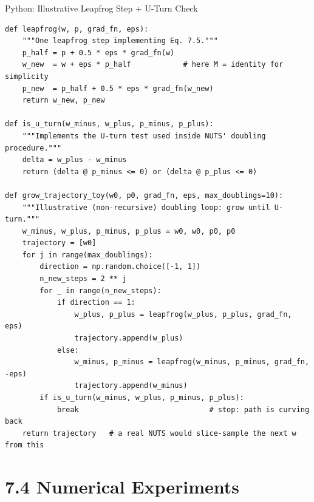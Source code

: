 \documentclass[aspectratio=169,10pt]{beamer}
\begin{document}
\begin{frame}[fragile]{Python: Illustrative Leapfrog Step + U-Turn Check}
\begin{lstlisting}[caption={Toy leapfrog integrator and a NUTS-style U-turn test (illustrative, simplified -- omits the full recursive doubling tree and slice sampling for brevity)}]
def leapfrog(w, p, grad_fn, eps):
    """One leapfrog step implementing Eq. 7.5."""
    p_half = p + 0.5 * eps * grad_fn(w)
    w_new  = w + eps * p_half            # here M = identity for simplicity
    p_new  = p_half + 0.5 * eps * grad_fn(w_new)
    return w_new, p_new

def is_u_turn(w_minus, w_plus, p_minus, p_plus):
    """Implements the U-turn test used inside NUTS' doubling procedure."""
    delta = w_plus - w_minus
    return (delta @ p_minus <= 0) or (delta @ p_plus <= 0)

def grow_trajectory_toy(w0, p0, grad_fn, eps, max_doublings=10):
    """Illustrative (non-recursive) doubling loop: grow until U-turn."""
    w_minus, w_plus, p_minus, p_plus = w0, w0, p0, p0
    trajectory = [w0]
    for j in range(max_doublings):
        direction = np.random.choice([-1, 1])
        n_new_steps = 2 ** j
        for _ in range(n_new_steps):
            if direction == 1:
                w_plus, p_plus = leapfrog(w_plus, p_plus, grad_fn, eps)
                trajectory.append(w_plus)
            else:
                w_minus, p_minus = leapfrog(w_minus, p_minus, grad_fn, -eps)
                trajectory.append(w_minus)
        if is_u_turn(w_minus, w_plus, p_minus, p_plus):
            break                              # stop: path is curving back
    return trajectory   # a real NUTS would slice-sample the next w from this
\end{lstlisting}
\end{frame}

\section{7.4 Numerical Experiments}
\end{document}
